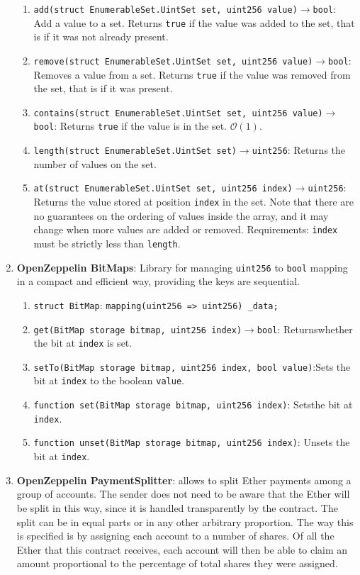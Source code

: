 \begin{enumerate}
\begin{enumerate}
	\item\verb|add(struct EnumerableSet.UintSet set, uint256 value)|$\rightarrow$\verb|bool|: Add a value to a set. Returns \verb|true| if the value was added to the set, that is if it was not already present.
	\item\verb|remove(struct EnumerableSet.UintSet set, uint256 value)|$\rightarrow$\verb|bool|: Removes a value from a set. Returns \verb|true| if the value was removed from the set, that is if it was present.
	\item\verb|contains(struct EnumerableSet.UintSet set, uint256 value)|$\rightarrow$\verb|bool|: Returns \verb|true| if the value is in the set. $\mathcal{O}(1)$.
	\item\verb|length(struct EnumerableSet.UintSet set)|$\rightarrow$\verb|uint256|: Returns the number of values on the set.
	\item\verb|at(struct EnumerableSet.UintSet set, uint256 index)|$\rightarrow$\verb|uint256|: Returns the value stored at position \verb|index| in the set. Note that there are no guarantees on the ordering of values inside the array, and it may change when more values are added or removed. Requirements: \verb|index| must be strictly less than \verb|length|.
	\end{enumerate}

\item\textbf{OpenZeppelin BitMaps}: Library for managing \verb|uint256| to \verb|bool| mapping in a compact and efficient way, providing the keys are sequential.
	\begin{enumerate}
	\item\verb|struct BitMap|: \verb|mapping(uint256 => uint256) _data;|
	\item\verb|get(BitMap storage bitmap, uint256 index)|$\rightarrow$\verb|bool|: Returns\linebreak whether the bit at \verb|index| is set.
	\item\verb|setTo(BitMap storage bitmap, uint256 index, bool value)|:\linebreak Sets the bit at \verb|index| to the boolean \verb|value|.
	\item\verb|function set(BitMap storage bitmap, uint256 index)|: Sets\linebreak the bit at \verb|index|.
	\item\verb|function unset(BitMap storage bitmap, uint256 index)|: Unsets the bit at \verb|index|.
	\end{enumerate}

\item\textbf{OpenZeppelin PaymentSplitter}: allows to split Ether payments among a group of accounts. The sender does not need to be aware that the Ether will be split in this way, since it is handled transparently by the contract. The split can be in equal parts or in any other arbitrary proportion. The way this is specified is by assigning each account to a number of shares. Of all the Ether that this contract receives, each account will then be able to claim an amount proportional to the percentage of total shares they were assigned.\\


\end{enumerate}
